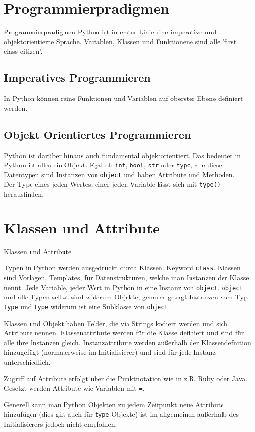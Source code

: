 \section{Programmierpradigmen}
\begin{frame}{Programmierpradigmen}
Python ist in erster Linie eine imperative und objektorientierte Sprache. Variablen, Klassen und Funktionene sind alle 'first class citizen'.

\subsection{Imperatives Programmieren}

In Python können reine Funktionen und Variablen auf oberster Ebene definiert werden.

\subsection{Objekt Orientiertes Programmieren}

Python ist darüber hinaus auch fundamental objektorientiert. Das bedeutet in Python ist alles ein Objekt. Egal ob \texttt{int}, \texttt{bool}, \texttt{str} oder \texttt{type}, alle diese Datentypen sind Instanzen von \texttt{object} und haben Attribute und Methoden.\\
Der Type eines jeden Wertes, einer jeden Variable lässt sich mit \texttt{type()} herausfinden.

\end{frame}


\section{Klassen und Attribute}
\begin{frame}{Klassen und Attribute}

Typen in Python werden ausgedrückt durch Klassen. Keyword \texttt{class}. Klassen sind Vorlagen, Templates, für Datenstrukturen, welche man Instanzen der Klasse nennt.
Jede Variable, jeder Wert in Python in eine Instanz von \texttt{object}. \texttt{object} und alle Typen selbst sind widerum Objekte, genauer gesagt Instanzen vom Typ \texttt{type} und \texttt{type} widerum ist eine Subklasse von \texttt{object}. 

Klassen und Objekt haben Felder, die via Strings kodiert werden und sich Attribute nennen. Klassenattribute werden für die Klasse definiert und sind für alle ihre Instanzen gleich. Instanzattribute werden außerhalb der Klassendefnition hinzugefügt (normalerweise im Initialisierer) und sind für jede Instanz unterschiedlich.

Zugriff auf Attribute erfolgt über die Punktnotation wie in z.B. Ruby oder Java. Gesetzt werden Attribute wie Variablen mit \texttt{=}.

Generell kann man Python Objekten zu jedem Zeitpunkt neue Attribute hinzufügen (dies gilt auch für \texttt{type} Objekte) ist im allgemeinen außerhalb des Initialisierers jedoch nicht empfohlen.

\end{frame}

